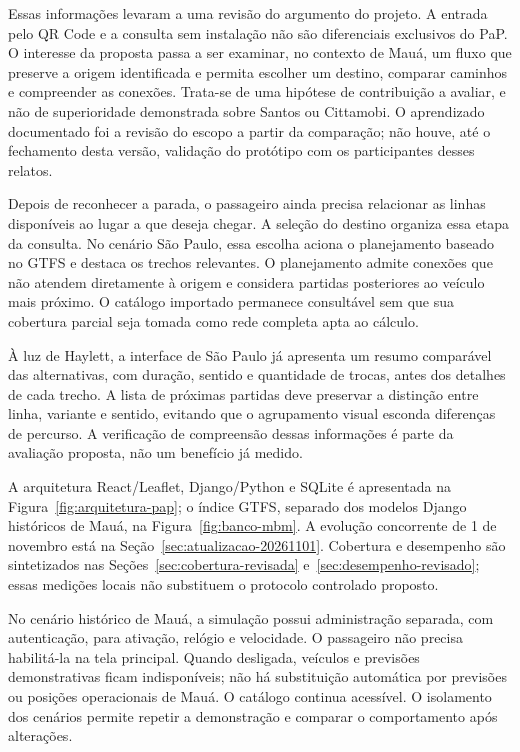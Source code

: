 Essas informações levaram a uma revisão do argumento do projeto. A entrada pelo QR Code e a consulta sem instalação não são diferenciais exclusivos do PaP. O interesse da proposta passa a ser examinar, no contexto de Mauá, um fluxo que preserve a origem identificada e permita escolher um destino, comparar caminhos e compreender as conexões. Trata-se de uma hipótese de contribuição a avaliar, e não de superioridade demonstrada sobre Santos ou Cittamobi. O aprendizado documentado foi a revisão do escopo a partir da comparação; não houve, até o fechamento desta versão, validação do protótipo com os participantes desses relatos.

Depois de reconhecer a parada, o passageiro ainda precisa relacionar as linhas disponíveis ao lugar a que deseja chegar. A seleção do destino organiza essa etapa da consulta. No cenário São Paulo, essa escolha aciona o planejamento baseado no GTFS e destaca os trechos relevantes. O planejamento admite conexões que não atendem diretamente à origem e considera partidas posteriores ao veículo mais próximo. O catálogo importado permanece consultável sem que sua cobertura parcial seja tomada como rede completa apta ao cálculo.

À luz de Haylett, a interface de São Paulo já apresenta um resumo comparável das alternativas, com duração, sentido e quantidade de trocas, antes dos detalhes de cada trecho. A lista de próximas partidas deve preservar a distinção entre linha, variante e sentido, evitando que o agrupamento visual esconda diferenças de percurso. A verificação de compreensão dessas informações é parte da avaliação proposta, não um benefício já medido.

A arquitetura React/Leaflet, Django/Python e SQLite é apresentada na Figura~\ref{fig:arquitetura-pap}; o índice GTFS, separado dos modelos Django históricos de Mauá, na Figura~\ref{fig:banco-mbm}. A evolução concorrente de 1 de novembro está na Seção~\ref{sec:atualizacao-20261101}. Cobertura e desempenho são sintetizados nas Seções~\ref{sec:cobertura-revisada} e~\ref{sec:desempenho-revisado}; essas medições locais não substituem o protocolo controlado proposto.

No cenário histórico de Mauá, a simulação possui administração separada, com autenticação, para ativação, relógio e velocidade. O passageiro não precisa habilitá-la na tela principal. Quando desligada, veículos e previsões demonstrativas ficam indisponíveis; não há substituição automática por previsões ou posições operacionais de Mauá. O catálogo continua acessível. O isolamento dos cenários permite repetir a demonstração e comparar o comportamento após alterações.

